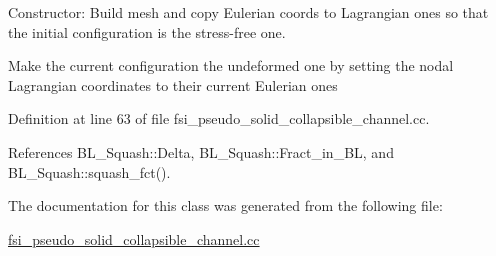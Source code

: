 Constructor\+: Build mesh and copy Eulerian coords to Lagrangian ones so that the initial configuration is the stress-\/free one. 

Make the current configuration the undeformed one by setting the nodal Lagrangian coordinates to their current Eulerian ones 

Definition at line 63 of file fsi\+\_\+pseudo\+\_\+solid\+\_\+collapsible\+\_\+channel.\+cc.



References B\+L\+\_\+\+Squash\+::\+Delta, B\+L\+\_\+\+Squash\+::\+Fract\+\_\+in\+\_\+\+BL, and B\+L\+\_\+\+Squash\+::squash\+\_\+fct().



The documentation for this class was generated from the following file\+:\begin{DoxyCompactItemize}
\item 
\hyperlink{fsi__pseudo__solid__collapsible__channel_8cc}{fsi\+\_\+pseudo\+\_\+solid\+\_\+collapsible\+\_\+channel.\+cc}\end{DoxyCompactItemize}
